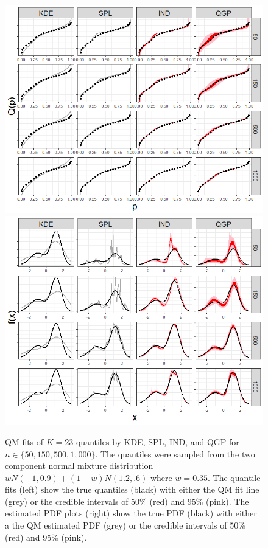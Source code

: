 \documentclass[preprint,12pt,authoryear]{elsarticle}
\begin{document}
\begin{figure}[hbt!]
\centering
  \centering
  \includegraphics[width=.49\linewidth]{Images/quants_gmix.png}
  \centering
  \includegraphics[width=.49\linewidth]{Images/dens_gmix.png}
\caption{QM fits of $K=23$ quantiles by KDE, SPL, IND, and QGP for $n \in \{50, 150, 500, 1{,}000\}$. The quantiles were sampled from the two component normal mixture distribution $w N(-1, 0.9) + (1-w)N(1.2, .6)$ where $w = 0.35$. The quantile fits (left) show the true quantiles (black) with either the QM fit line (grey) or the credible intervals of 50\% (red) and 95\% (pink). 
The estimated PDF plots (right) show the true PDF (black) with either a the QM estimated PDF (grey) or the credible intervals of 50\% (red) and 95\% (pink). }
\label{fig:gmix_fits}
\end{figure}
\end{document}
